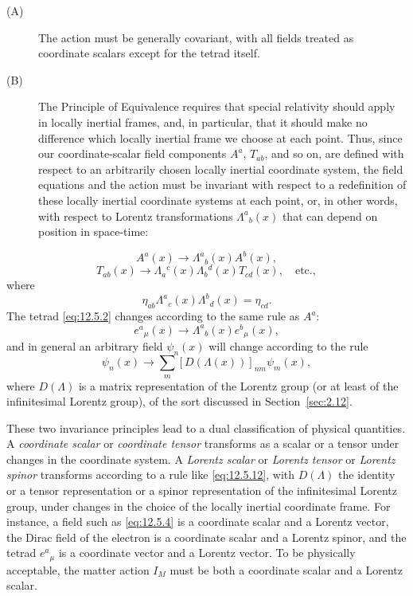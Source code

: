 \begin{description}
  \item[(A)] The action must be generally covariant, with all fields treated
  as coordinate scalars except for the tetrad itself.

  \item[(B)] The Principle of Equivalence requires that special relativity
  should apply in locally inertial frames, and, in particular, that it should
  make no difference which locally inertial frame we choose at each point.
  Thus, since our coordinate-scalar field components \(A^a\), \(T_{ab}\), and
  so on, are defined with respect to an arbitrarily chosen locally inertial
  coordinate system, the field equations and the action must be invariant
  with respect to a redefinition of these locally inertial coordinate systems
  at each point, or, in other words, with respect to Lorentz transformations
  \(\Lambda^a{}_b(x)\) that can depend on position in space-time:
\end{description}
\[
  A^a(x)\longrightarrow\Lambda^a{}_b(x)A^b(x),
\]
\[
  T_{ab}(x)
  \longrightarrow
  \Lambda_a{}^c(x)\Lambda_b{}^d(x)T_{cd}(x),
  \quad\text{etc.},
\]
where
\begin{equation}
  \eta_{ab}\Lambda^a{}_c(x)\Lambda^b{}_d(x)
  =
  \eta_{cd}.
  \tag{12.5.10}\label{eq:12.5.10}
\end{equation}
The tetrad \eqref{eq:12.5.2} changes according to the same rule as \(A^a\):
\begin{equation}
  e^a{}_\mu(x)
  \longrightarrow
  \Lambda^a{}_b(x)e^b{}_\mu(x),
  \tag{12.5.11}\label{eq:12.5.11}
\end{equation}
and in general an arbitrary field \(\psi_n(x)\) will change according to the
rule
\begin{equation}
  \psi_n(x)
  \longrightarrow
  \sum_m[D(\Lambda(x))]_{nm}\psi_m(x),
  \tag{12.5.12}\label{eq:12.5.12}
\end{equation}
where \(D(\Lambda)\) is a matrix representation of the Lorentz group (or at
least of the infinitesimal Lorentz group), of the sort discussed in
Section~\ref{sec:2.12}.

These two invariance principles lead to a dual classification of physical
quantities. A \emph{coordinate scalar} or \emph{coordinate tensor} transforms
as a scalar or a tensor under changes in the coordinate system. A
\emph{Lorentz scalar} or \emph{Lorentz tensor} or \emph{Lorentz spinor}
transforms according to a rule like \eqref{eq:12.5.12}, with
\(D(\Lambda)\) the identity or a tensor representation or a spinor
representation of the infinitesimal Lorentz group, under changes in the
choice of the locally inertial coordinate frame. For instance, a field such
as \eqref{eq:12.5.4} is a coordinate scalar and a Lorentz vector, the Dirac
field of the electron is a coordinate scalar and a Lorentz spinor, and the
tetrad \(e^a{}_\mu\) is a coordinate vector and a Lorentz vector. To be
physically acceptable, the matter action \(I_M\) must be both a coordinate
scalar and a Lorentz scalar.

